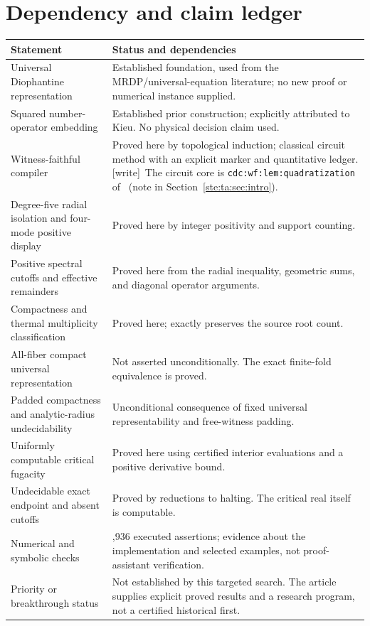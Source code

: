 \documentclass[11pt,letterpaper]{article}
\theoremstyle{definition}
\theoremstyle{remark}
\newcommand{\wtag}{\textup{[write]}}
\begin{document}
\section{Dependency and claim ledger}
\begin{longtable}{>{\raggedright\arraybackslash}p{}>{\raggedright\arraybackslash}p{}}
\toprule
Statement & Status and dependencies\\
\midrule
\endhead
Universal Diophantine representation & Established foundation, used from the MRDP/universal-equation literature; no new proof or numerical instance supplied.\\
Squared number-operator embedding & Established prior construction; explicitly attributed to Kieu. No physical decision claim used.\\
Witness-faithful compiler & Proved here by topological induction; classical circuit method with an explicit marker and quantitative ledger. \wtag\ The circuit core is \texttt{cdc:wf:lem:quadratization} of~\cite{cdc} (note in Section~\ref{ste:ta:sec:intro}).\\
Degree-five radial isolation and four-mode positive display & Proved here by integer positivity and support counting.\\
Positive spectral cutoffs and effective remainders & Proved here from the radial inequality, geometric sums, and diagonal operator arguments.\\
Compactness and thermal multiplicity classification & Proved here; exactly preserves the source root count.\\
All-fiber compact universal representation & Not asserted unconditionally. The exact finite-fold equivalence is proved.\\
Padded compactness and analytic-radius undecidability & Unconditional consequence of fixed universal representability and free-witness padding.\\
Uniformly computable critical fugacity & Proved here using certified interior evaluations and a positive derivative bound.\\
Undecidable exact endpoint and absent cutoffs & Proved by reductions to halting. The critical real itself is computable.\\
Numerical and symbolic checks & 7,936 executed assertions; evidence about the implementation and selected examples, not proof-assistant verification.\\
Priority or breakthrough status & Not established by this targeted search. The article supplies explicit proved results and a research program, not a certified historical first.\\
\bottomrule
\end{longtable}
\end{document}
